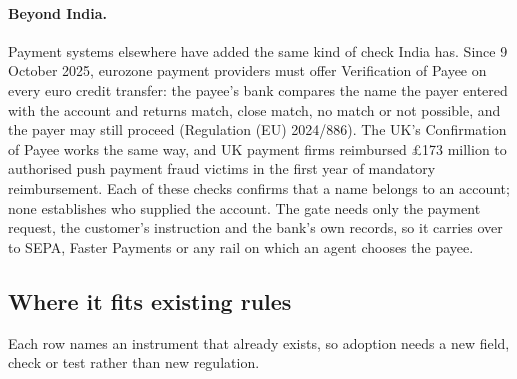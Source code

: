 \documentclass[10pt,a4paper]{article}
\begin{document}
\paragraph{Beyond India.} Payment systems elsewhere have added the same kind of check India has. Since 9 October 2025,
eurozone payment providers must offer Verification of Payee on every euro credit transfer: the payee's bank compares the
name the payer entered with the account and returns match, close match, no match or not possible, and the payer may still
proceed (Regulation (EU) 2024/886). The UK's Confirmation of Payee works the same way, and UK payment firms reimbursed
\pounds173 million to authorised push payment fraud victims in the first year of mandatory reimbursement. Each of these
checks confirms that a name belongs to an account; none establishes who supplied the account. The gate needs only the
payment request, the customer's instruction and the bank's own records, so it carries over to SEPA, Faster Payments or any
rail on which an agent chooses the payee.

\subsection*{Where it fits existing rules}

Each row names an instrument that already exists, so adoption needs a new field, check or test rather than new regulation.
\end{document}
